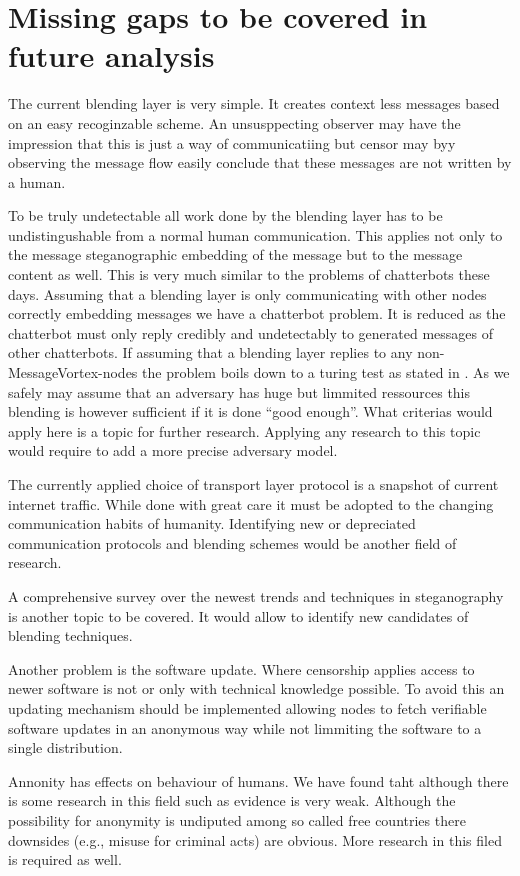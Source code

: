 \chapter{Missing gaps to be covered in future analysis}
The current blending layer is very simple. It creates context less messages based on an easy recoginzable scheme. An unsusppecting observer may have the impression that this is just a way of communicatiing but censor may byy observing the message flow easily conclude that these messages are not written by a human.

To be truly undetectable all work done by the blending layer has to be undistingushable from a normal human communication. This applies not only to the message steganographic embedding of the message but to the message content as well. This is very much similar to the problems of chatterbots these days. Assuming that a blending layer is only communicating with other nodes correctly embedding messages we have a chatterbot problem. It is reduced as the chatterbot must only reply credibly and undetectably to generated messages of other chatterbots. If assuming that a blending layer replies to any non-MessageVortex-nodes the problem boils down to a turing test as stated in \cite{turing1950computing}. As we safely may assume that an adversary has huge but limmited ressources this blending is however sufficient if it is done ``good enough''. What criterias would apply here is a topic for further research. Applying any research to this topic would require to add a more precise adversary model.

The currently applied choice of transport layer protocol is a snapshot of current internet traffic. While done with great care it must be adopted to the changing communication habits of humanity. Identifying new or depreciated communication protocols and blending schemes would be another field of research.
 
A comprehensive survey over the newest trends and techniques in steganography is another topic to be covered. It would allow to identify new candidates of blending techniques.

Another problem is the software update. Where censorship applies access to newer software is not or only with technical knowledge possible. To avoid this an updating mechanism should be implemented allowing  nodes to fetch verifiable software updates in an anonymous way while not limmiting the software to a single distribution.

Annonity has effects on behaviour of humans. We have found taht although there is some research in this field such as \cite{postmes2001social} evidence is very weak. Although the possibility for anonymity is undiputed among so called free countries there downsides (e.g., misuse for criminal acts) are obvious. More research in this filed is required as well.


